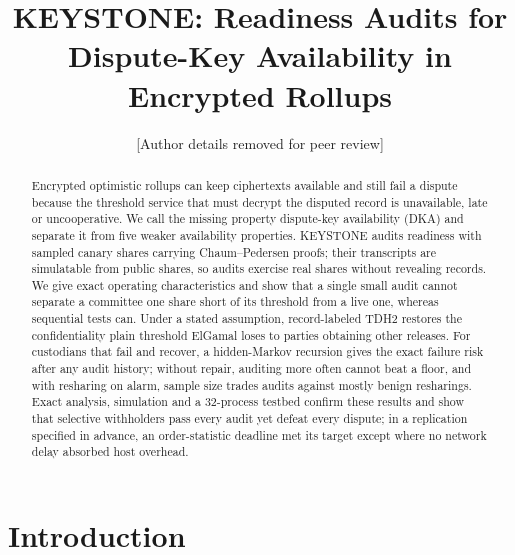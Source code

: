 \documentclass[Crown,sagev]{sagej}
\theoremstyle{plain}
\theoremstyle{definition}
\theoremstyle{remark}
\begin{document}
\setcounter{secnumdepth}{3}
\pdftrailerid{}


\title{KEYSTONE: Readiness Audits for Dispute-Key Availability in Encrypted Rollups}

\author{[Author details removed for peer review]}

\begin{abstract}
Encrypted optimistic rollups can keep ciphertexts available and still fail a dispute because the threshold service that must decrypt the disputed record is unavailable, late or uncooperative. We call the missing property dispute-key availability (DKA) and separate it from five weaker availability properties. KEYSTONE audits readiness with sampled canary shares carrying Chaum--Pedersen proofs; their transcripts are simulatable from public shares, so audits exercise real shares without revealing records. We give exact operating characteristics and show that a single small audit cannot separate a committee one share short of its threshold from a live one, whereas sequential tests can. Under a stated assumption, record-labeled TDH2 restores the confidentiality plain threshold ElGamal loses to parties obtaining other releases. For custodians that fail and recover, a hidden-Markov recursion gives the exact failure risk after any audit history; without repair, auditing more often cannot beat a floor, and with resharing on alarm, sample size trades audits against mostly benign resharings. Exact analysis, simulation and a 32-process testbed confirm these results and show that selective withholders pass every audit yet defeat every dispute; in a replication specified in advance, an order-statistic deadline met its target except where no network delay absorbed host overhead.
\end{abstract}


\maketitle

\section{Introduction}\label{sec:intro}
\end{document}
